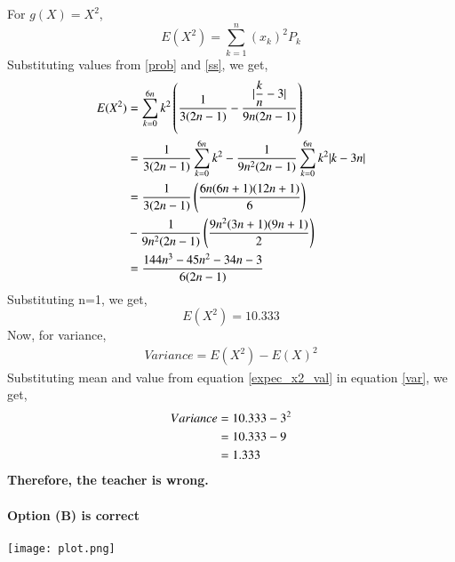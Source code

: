 \documentclass[journal,12pt,twocolumn]{IEEEtran}
\begin{document}
For $g(X)=X^2$,
\begin{equation}\label{expec_x2}
E(X^2) = \sum^{n}_{k=1}(x_k)^2 P_k
\end{equation}
Substituting values from \ref{prob} and \ref{ss}, we get,
\begin{align}
E(X^2) &= \sum^{6n}_{k=0}k^2\left(\dfrac{1}{3(2n-1)} - \dfrac{\vert\dfrac{k}{n}-3\vert}{9n(2n-1)}\right)
\\[\parskip]
     &= \dfrac{1}{3(2n-1)}\sum^{6n}_{k=0}k^2 - \dfrac{1}{9n^2(2n-1)}\sum^{6n}_{k=0}k^2\vert k-3n\vert
\\[\parskip]
     \nonumber&=\dfrac{1}{3(2n-1)}\left(\dfrac{6n(6n+1)(12n+1)}{6}\right)\\
     &- \dfrac{1}{9n^2(2n-1)}\left(\dfrac{9n^2(3n+1)(9n+1)}{2}\right)
\\[\parskip]
     &=\dfrac{144n^3-45n^2-34n-3}{6(2n-1)}
\end{align}
Substituting n=1, we get,
\begin{equation}\label{expec_x2_val}
E(X^2) = 10.333
\end{equation}
Now, for variance,
\begin{align}\label{var}
Variance = E(X^2)-E(X)^2
\end{align}
Substituting mean and value from equation \ref{expec_x2_val} in equation \ref{var}, we get,
\begin{align}
Variance &= 10.333 - 3^2
       \\[\parskip]
  &= 10.333 - 9
  \\[\parskip]
  &= 1.333
  \\[\parskip]
\end{align}
\textbf{Therefore, the teacher is  wrong.}\\\\
\textbf{Option (B) is correct}\\\\
\texttt{[image: plot.png]}
\end{document}
